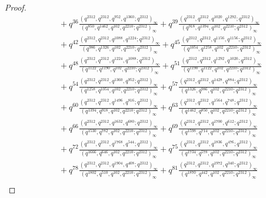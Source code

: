 \documentclass[11pt,a4paper]{article}
\numberwithin{equation}{section}
\theoremstyle{plain}
\begin{document}
\begin{proof}
\[\begin{aligned}
			&\quad + q^{36}\frac{(q^{2312}, q^{2312}, q^{952}, q^{1360}; q^{2312})_{\infty}}
			{(q^{850}, q^{1462}, q^{102}, q^{2210}; q^{2312})_{\infty}}
			+ q^{39}\frac{(q^{2312}, q^{2312}, q^{1020}, q^{1292}; q^{2312})_{\infty}}
			{(q^{918}, q^{1394}, q^{102}, q^{2210}; q^{2312})_{\infty}} \\
			&\quad +q^{42}\frac{(q^{2312}, q^{2312}, q^{1088}, q^{1224}; q^{2312})_{\infty}}
			{(q^{986}, q^{1326}, q^{102}, q^{2210}; q^{2312})_{\infty}} 
			+ q^{45}\frac{(q^{2312}, q^{2312}, q^{1156}, q^{1156}; q^{2312})_{\infty}}
			{(q^{1054}, q^{1258}, q^{102}, q^{2210}; q^{2312})_{\infty}} \\
			&\quad +  q^{48}\frac{(q^{2312}, q^{2312}, q^{1224}, q^{1088}; q^{2312})_{\infty}}
			{(q^{1122}, q^{1190}, q^{102}, q^{2210}; q^{2312})_{\infty}}
			+ q^{51}\frac{(q^{2312}, q^{2312}, q^{1292}, q^{1020}; q^{2312})_{\infty}}
			{(q^{1190}, q^{1122}, q^{102}, q^{2210}; q^{2312})_{\infty}} \\
			&\quad + q^{54}\frac{(q^{2312}, q^{2312}, q^{1360}, q^{952}; q^{2312})_{\infty}}
			{(q^{1258}, q^{1054}, q^{102}, q^{2210}; q^{2312})_{\infty}} 
			+ q^{57}\frac{(q^{2312}, q^{2312}, q^{1428}, q^{884}; q^{2312})_{\infty}}
			{(q^{1326}, q^{986}, q^{102}, q^{2210}; q^{2312})_{\infty}} \\
			&\quad + q^{60}\frac{(q^{2312}, q^{2312}, q^{1496}, q^{816}; q^{2312})_{\infty}}
			{(q^{1394}, q^{918}, q^{102}, q^{2210}; q^{2312})_{\infty}}
			+ q^{63}\frac{(q^{2312}, q^{2312}, q^{1564}, q^{748}; q^{2312})_{\infty}}
			{(q^{1462}, q^{850}, q^{102}, q^{2210}; q^{2312})_{\infty}} \\
			&\quad +  q^{66}\frac{(q^{2312}, q^{2312}, q^{1632}, q^{680}; q^{2312})_{\infty}}
			{(q^{1530}, q^{782}, q^{102}, q^{2210}; q^{2312})_{\infty}}
			+ q^{69}\frac{(q^{2312}, q^{2312}, q^{1700}, q^{612}; q^{2312})_{\infty}}
			{(q^{1598}, q^{714}, q^{102}, q^{2210}; q^{2312})_{\infty}} \\
			&\quad + q^{72}\frac{(q^{2312}, q^{2312}, q^{1768}, q^{544}; q^{2312})_{\infty}}
			{(q^{1666}, q^{646}, q^{102}, q^{2210}; q^{2312})_{\infty}}
			+ q^{75}\frac{(q^{2312}, q^{2312}, q^{1836}, q^{476}; q^{2312})_{\infty}}
			{(q^{1734}, q^{578}, q^{102}, q^{2210}; q^{2312})_{\infty}} \\
			&\quad +  q^{78}\frac{(q^{2312}, q^{2312}, q^{1904}, q^{408}; q^{2312})_{\infty}}
			{(q^{1802}, q^{510}, q^{102}, q^{2210}; q^{2312})_{\infty}} 
			+ q^{81}\frac{(q^{2312}, q^{2312}, q^{1972}, q^{340}; q^{2312})_{\infty}}
			{(q^{1870}, q^{442}, q^{102}, q^{2210}; q^{2312})_{\infty}} \\

\end{aligned}\]
\end{proof}
\end{document}

